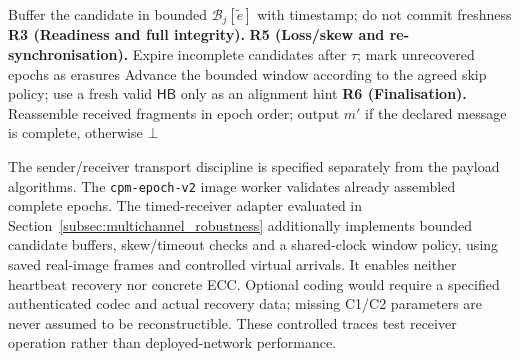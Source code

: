 \documentclass[pdflatex,sn-mathphys-num]{sn-jnl}%
\theoremstyle{definition}
\theoremstyle{game}
\theoremstyle{thmstyleone}%
\theoremstyle{thmstyletwo}%
\theoremstyle{thmstylethree}%
\begin{document}
\begin{algorithm}[H]
{{
Buffer the candidate in bounded $\mathcal B_j[\tilde e]$ with timestamp; do not commit freshness\;
\textbf{R3 (Readiness and full integrity).}
\textbf{R5 (Loss/skew and re-synchronisation).}
Expire incomplete candidates after $\tau$; mark unrecovered epochs as erasures\;
Advance the bounded window according to the agreed skip policy;
use a fresh valid $\mathsf{HB}$ only as an alignment hint\;
}
\textbf{R6 (Finalisation).} Reassemble received fragments in epoch order;
output $m'$ if the declared message is complete, otherwise $\bot$\;
}
\end{algorithm}

The sender/receiver transport discipline is specified separately from the
payload algorithms. The \texttt{cpm-epoch-v2} image worker validates already assembled complete
epochs. The timed-receiver adapter evaluated in
Section~\ref{subsec:multichannel_robustness} additionally implements bounded
candidate buffers, skew/timeout checks and a shared-clock window policy,
using saved real-image frames and controlled virtual arrivals. It enables
neither heartbeat recovery nor concrete ECC. Optional coding would require
a specified authenticated codec and actual recovery data; missing C1/C2
parameters are never assumed to be reconstructible. These controlled traces
test receiver operation rather than deployed-network performance.
\end{document}
